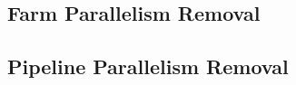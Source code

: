 %

\subsection{Farm Parallelism Removal} \label{sec:removefarm}

\subsection{Pipeline Parallelism Removal} \label{sec:removepipeline}

